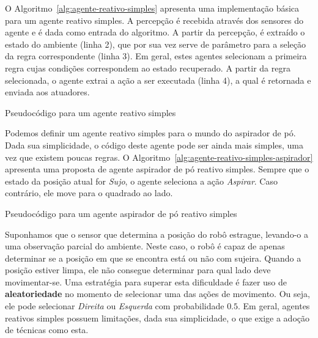 O Algoritmo~\ref{alg:agente-reativo-simples} apresenta uma implementação básica para um agente reativo simples. A percepção é recebida através dos sensores do agente e é dada como entrada do algoritmo. A partir da percepção, é extraído o estado do ambiente (linha 2), que por sua vez serve de parâmetro para a seleção da regra correspondente (linha 3). Em geral, estes agentes selecionam a primeira regra cujas condições correspondem ao estado recuperado. A partir da regra selecionada, o agente extrai a ação a ser executada (linha 4), a qual é retornada e enviada aos atuadores.

\begin{algorithm}[h]
	\DontPrintSemicolon
	
	
	\caption{Pseudocódigo para um agente reativo simples}
	\label{alg:agente-reativo-simples}
\end{algorithm}

Podemos definir um agente reativo simples para o mundo do aspirador de pó. Dada sua simplicidade, o código deste agente pode ser ainda mais simples, uma vez que existem poucas regras. O Algoritmo~\ref{alg:agente-reativo-simples-aspirador} apresenta uma proposta de agente aspirador de pó reativo simples. Sempre que o estado da posição atual for \textit{Sujo}, o agente seleciona a ação \textit{Aspirar}. Caso contrário, ele move para o quadrado ao lado.

\begin{algorithm}[h]
	\DontPrintSemicolon
	
	
	\caption{Pseudocódigo para um agente aspirador de pó reativo simples}
	\label{alg:agente-reativo-simples-aspirador}
\end{algorithm}

Suponhamos que o sensor que determina a posição do robô estrague, levando-o a uma observação parcial do ambiente. Neste caso, o robô é capaz de apenas determinar se a posição em que se encontra está ou não com sujeira. Quando a posição estiver limpa, ele não consegue determinar para qual lado deve movimentar-se. Uma estratégia para superar esta dificuldade é fazer uso de \textbf{aleatoriedade} no momento de selecionar uma das ações de movimento. Ou seja, ele pode selecionar \textit{Direita} ou \textit{Esquerda} com probabilidade $0.5$. Em geral, agentes reativos simples possuem limitações, dada sua simplicidade, o que exige a adoção de técnicas como esta.


